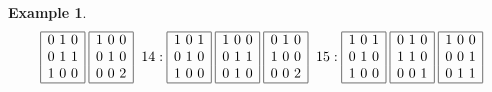 \documentclass[12pt]{article}
\theoremstyle{definition}
\newtheorem{Example}[Theorem]{Example}
\begin{document}
\begin{Example}
\[{\begin{array}{|c|}
\end{array}
\hspace*{1mm}
\begin{array}{|c|}\hline
0\ 1\ 0\\ 0\ 1\ 1\\ 1\ 0\ 0\\ \hline
\end{array}
\hspace*{1mm}
\begin{array}{|c|}\hline
1\ 0\ 0\\ 0\ 1\ 0\\ 0\ 0\ 2\\ \hline
\end{array}
\hspace*{2mm}
14: 
\begin{array}{|c|}\hline
1\ 0\ 1\\ 0\ 1\ 0\\ 1\ 0\ 0\\ \hline
\end{array}
\hspace*{1mm}
\begin{array}{|c|}\hline
1\ 0\ 0\\ 0\ 1\ 1\\ 0\ 1\ 0\\ \hline
\end{array}
\hspace*{1mm}
\begin{array}{|c|}\hline
0\ 1\ 0\\ 1\ 0\ 0\\ 0\ 0\ 2\\ \hline
\end{array}
\hspace*{2mm}
15: 
\begin{array}{|c|}\hline
1\ 0\ 1\\ 0\ 1\ 0\\ 1\ 0\ 0\\ \hline
\end{array}
\hspace*{1mm}
\begin{array}{|c|}\hline
0\ 1\ 0\\ 1\ 1\ 0\\ 0\ 0\ 1\\ \hline
\end{array}
\hspace*{1mm}
\begin{array}{|c|}\hline
1\ 0\ 0\\ 0\ 0\ 1\\ 0\ 1\ 1\\ \hline

\end{array}}\]
\end{Example}
\end{document}
